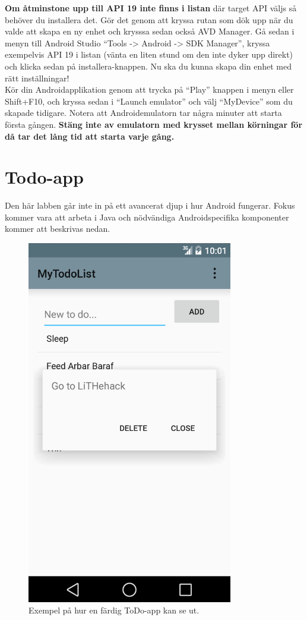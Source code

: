 \documentclass[11 pt, titlepage]{article} %
\begin{document}
\textbf{Om åtminstone upp till API 19 inte finns i listan} där target API väljs så behöver du installera det.
Gör det genom att kryssa rutan som dök upp när du valde att skapa en ny enhet och krysssa sedan också AVD Manager.
Gå sedan i menyn till Android Studio “Tools -> Android -> SDK Manager”, kryssa exempelvis API 19 i listan (vänta en liten stund om den inte dyker upp direkt) och klicka sedan på installera-knappen.
Nu ska du kunna skapa din enhet med rätt inställningar!\\

Kör din Androidapplikation genom att trycka på “Play” knappen i menyn eller Shift+F10, och kryssa sedan i ``Launch emulator'' och välj ``MyDevice'' som du skapade tidigare.
Notera att Androidemulatorn tar några minuter att starta första gången.
\textbf{Stäng inte av emulatorn med krysset mellan körningar för då tar det lång tid att starta varje gång.}

\section{Todo-app}
Den här labben går inte in på ett avancerat djup i hur Android fungerar.
Fokus kommer vara att arbeta i Java och nödvändiga Androidspecifika komponenter kommer att beskrivas nedan.
\begin{figure}[ht!]
\centering
\includegraphics[width=90mm]{images/app.png}
\caption{Exempel på hur en färdig ToDo-app kan se ut.}
\label{overflow}
\end{figure}
\end{document}
